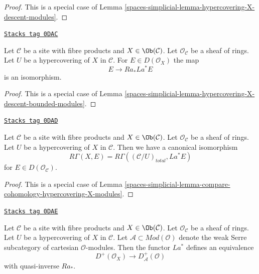 \begin{proof}
This is a special case of
Lemma \ref{spaces-simplicial-lemma-hypercovering-X-descent-modules}.
\end{proof}

\begin{lemma}
\label{spaces-simplicial-lemma-hypercovering-X-simple-descent-bounded-modules}
\href{https://stacks.math.columbia.edu/tag/0DAC}{\texttt{Stacks tag 0DAC}}

Let $\mathcal{C}$ be a site with fibre products and $X \in \Ob(\mathcal{C})$.
Let $\mathcal{O}_\mathcal{C}$ be a sheaf of rings.
Let $U$ be a hypercovering of $X$ in $\mathcal{C}$. For
$E \in D(\mathcal{O}_X)$ the map
$$
E \longrightarrow Ra_*La^*E
$$
is an isomorphism.
\end{lemma}

\begin{proof}
This is a special case of
Lemma \ref{spaces-simplicial-lemma-hypercovering-X-descent-bounded-modules}.
\end{proof}

\begin{lemma}
\label{spaces-simplicial-lemma-compare-cohomology-hypercovering-X-simple-modules}
\href{https://stacks.math.columbia.edu/tag/0DAD}{\texttt{Stacks tag 0DAD}}

Let $\mathcal{C}$ be a site with fibre products and $X \in \Ob(\mathcal{C})$.
Let $\mathcal{O}_\mathcal{C}$ be a sheaf of rings.
Let $U$ be a hypercovering of $X$ in $\mathcal{C}$.
Then we have a canonical isomorphism
$$
R\Gamma(X, E) = R\Gamma((\mathcal{C}/U)_{total}, La^*E)
$$
for $E \in D(\mathcal{O}_\mathcal{C})$.
\end{lemma}

\begin{proof}
This is a special case of
Lemma \ref{spaces-simplicial-lemma-compare-cohomology-hypercovering-X-modules}.
\end{proof}

\begin{lemma}
\label{spaces-simplicial-lemma-hypercovering-X-simple-equivalence-bounded-modules}
\href{https://stacks.math.columbia.edu/tag/0DAE}{\texttt{Stacks tag 0DAE}}

Let $\mathcal{C}$ be a site with fibre products and $X \in \Ob(\mathcal{C})$.
Let $\mathcal{O}_\mathcal{C}$ be a sheaf of rings.
Let $U$ be a hypercovering of $X$ in $\mathcal{C}$.
Let $\mathcal{A} \subset \textit{Mod}(\mathcal{O})$
denote the weak Serre subcategory of cartesian $\mathcal{O}$-modules.
Then the functor $La^*$ defines an equivalence
$$
D^+(\mathcal{O}_X) \longrightarrow D_\mathcal{A}^+(\mathcal{O})
$$
with quasi-inverse $Ra_*$.
\end{lemma}

